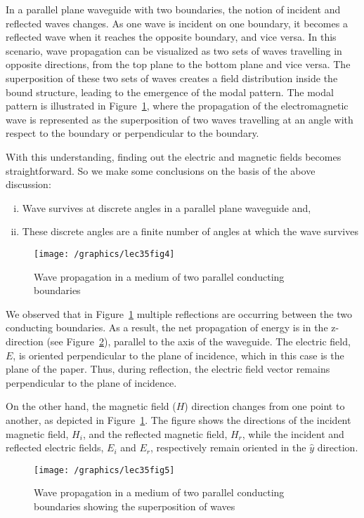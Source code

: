 In a parallel plane waveguide with two boundaries, the notion of incident and reflected waves changes. As one wave is incident on one boundary, it becomes a reflected wave when it reaches the opposite boundary, and vice versa. In this scenario, wave propagation can be visualized as two sets of waves travelling in opposite directions, from the top plane to the bottom plane and vice versa. The superposition of these two sets of waves creates a field distribution inside the bound structure, leading to the emergence of the modal pattern. The modal pattern is illustrated in Figure~\ref{fig:lec35fig4}, where the propagation of the electromagnetic wave is represented as the superposition of two waves travelling at an angle with respect to the boundary or perpendicular to the boundary.

With this understanding, finding out the electric and magnetic fields becomes straightforward. So we make some conclusions on the basis of the above discussion:
\begin{enumerate}[(i)]
\item Wave survives at discrete angles in a parallel plane waveguide and,
\item These discrete angles are a finite number of angles at which the wave survives
\end{enumerate}
\begin{figure}[h]
\centering
\texttt{[image: /graphics/lec35fig4]}
\caption{Wave propagation in a medium of two parallel conducting boundaries}
\label{fig:lec35fig4}
\end{figure}

We observed that in Figure~\ref{fig:lec35fig4} multiple reflections are occurring between the two conducting boundaries. As a result, the net propagation of energy is in the z-direction (see Figure~\ref{fig:lec35fig5}), parallel to the axis of the waveguide. The electric field, $E$, is oriented perpendicular to the plane of incidence, which in this case is the plane of the paper. Thus, during reflection, the electric field vector remains perpendicular to the plane of incidence.

On the other hand, the magnetic field ($H$) direction changes from one point to another, as depicted in Figure~\ref{fig:lec35fig4}. The figure shows the directions of the incident magnetic field, $H_i$, and the reflected magnetic field, $H_r$, while the incident and reflected electric fields, $E_i$ and $E_r$, respectively remain oriented in the $\hat{y}$ direction.
\begin{figure}[h]
\centering
\texttt{[image: /graphics/lec35fig5]}
\caption{Wave propagation in a medium of two parallel conducting boundaries showing the superposition of waves}
\label{fig:lec35fig5}
\end{figure}

